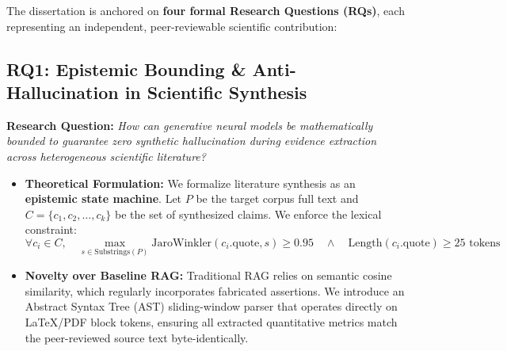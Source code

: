 \documentclass[10pt,a4paper]{article}
\begin{document}
The dissertation is anchored on \textbf{four formal Research Questions (RQs)}, each representing an independent, peer-reviewable scientific contribution:

\subsection{RQ1: Epistemic Bounding \& Anti-Hallucination in Scientific Synthesis}
\textbf{Research Question:} \textit{How can generative neural models be mathematically bounded to guarantee zero synthetic hallucination during evidence extraction across heterogeneous scientific literature?}
\begin{itemize}
  \item \textbf{Theoretical Formulation:} We formalize literature synthesis as an \textbf{epistemic state machine}. Let $P$ be the target corpus full text and $C = \{c_1, c_2, \dots, c_k\}$ be the set of synthesized claims. We enforce the lexical constraint:
  \begin{equation}
    \forall c_i \in C, \quad \max_{s \in \text{Substrings}(P)} \text{JaroWinkler}(c_i.\text{quote}, s) \ge 0.95 \quad \land \quad \text{Length}(c_i.\text{quote}) \ge 25 \text{ tokens}
  \end{equation}
  \item \textbf{Novelty over Baseline RAG:} Traditional RAG relies on semantic cosine similarity, which regularly incorporates fabricated assertions. We introduce an Abstract Syntax Tree (AST) sliding-window parser that operates directly on LaTeX/PDF block tokens, ensuring all extracted quantitative metrics match the peer-reviewed source text byte-identically.
\end{itemize}
\end{document}

